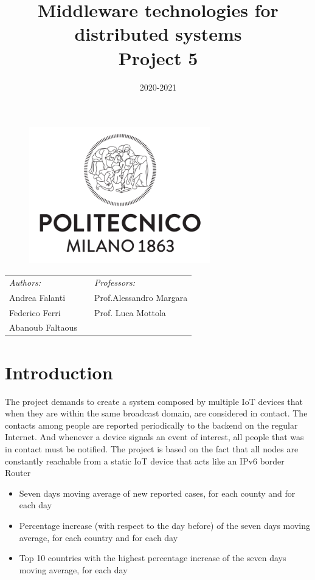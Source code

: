 \documentclass[10pt]{article}
\title{Middleware technologies for distributed systems\\Project 5}
\date{2020-2021}
\begin{document}
	\begin{titlepage}
		\begin{figure}[t]
			\centering\includegraphics[width=0.7\textwidth]{../../docResources/logo_polimi}
		\end{figure}
		\maketitle
		
		\large
		\begin{tabularx}{\linewidth}{@{}lXl@{}}
			\textit{Authors:}  & & \textit{Professors:} \\
			Andrea Falanti      & & Prof.\@ Alessandro Margara\\
			Federico Ferri  & & Prof. Luca Mottola \\
			Abanoub Faltaous & & \\
		\end{tabularx}		
		\thispagestyle{empty}
	\end{titlepage}
	
	\tableofcontents
	\newpage
	
	\section{Introduction}
	The project demands to create a system composed by multiple IoT devices that when they are within the same broadcast domain, are considered in contact. The contacts among people are reported periodically to the backend on the regular Internet. And whenever a device signals an event of interest, all people that was in contact must be notified. The project is based on the fact that all nodes are constantly reachable from a static IoT device that acts like an IPv6 border Router   
	
	\begin{itemize}
		\item Seven days moving average of new reported cases, for each county and for each day
		\item Percentage increase (with respect to the day before) of the seven days moving average, for each country and for each day
		\item Top 10 countries with the highest percentage increase of the seven days moving average, for each day
	\end{itemize}
\end{document}
